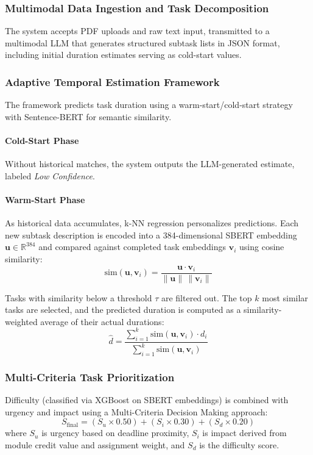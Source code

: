 \documentclass[conference]{IEEEtran}
\begin{document}
\subsubsection{Multimodal Data Ingestion and Task Decomposition}
The system accepts PDF uploads and raw text input, transmitted to a multimodal LLM that generates structured subtask lists in JSON format, including initial duration estimates serving as cold-start values.

\subsubsection{Adaptive Temporal Estimation Framework}
The framework predicts task duration using a warm-start/cold-start strategy with Sentence-BERT \cite{b7} for semantic similarity.

\paragraph{Cold-Start Phase}
Without historical matches, the system outputs the LLM-generated estimate, labeled \textit{Low Confidence}.

\paragraph{Warm-Start Phase}
As historical data accumulates, k-NN regression personalizes predictions. Each new subtask description is encoded into a 384-dimensional SBERT embedding $\mathbf{u} \in \mathbb{R}^{384}$ and compared against completed task embeddings $\mathbf{v}_i$ using cosine similarity:
\begin{equation}
\text{sim}(\mathbf{u}, \mathbf{v}_i) = \frac{\mathbf{u} \cdot \mathbf{v}_i}{\|\mathbf{u}\| \, \|\mathbf{v}_i\|}
\label{eq_similarity}
\end{equation}

Tasks with similarity below a threshold $\tau$ are filtered out. The top $k$ most similar tasks are selected, and the predicted duration is computed as a similarity-weighted average of their actual durations:
\begin{equation}
\hat{d} = \frac{\sum_{i=1}^{k} \text{sim}(\mathbf{u}, \mathbf{v}_i) \cdot d_i}{\sum_{i=1}^{k} \text{sim}(\mathbf{u}, \mathbf{v}_i)}
\label{eq_weighted_duration}
\end{equation}

\subsubsection{Multi-Criteria Task Prioritization}
Difficulty (classified via XGBoost on SBERT embeddings) is combined with urgency and impact using a Multi-Criteria Decision Making approach:
\begin{equation}
S_{\text{final}} = (S_u \times 0.50) + (S_i \times 0.30) + (S_d \times 0.20)
\label{eq_priority}
\end{equation}
where $S_u$ is urgency based on deadline proximity, $S_i$ is impact derived from module credit value and assignment weight, and $S_d$ is the difficulty score.
\end{document}
